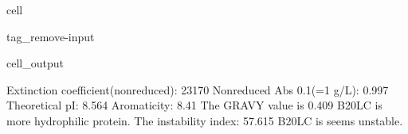 \documentclass[letterpaper,10pt,english]{jupyterBook}
\begin{document}
\begin{sphinxuseclass}{cell}
\begin{sphinxuseclass}{tag_remove-input}
\begin{sphinxVerbatimOutput}
\begin{sphinxuseclass}{cell_output}
\begin{sphinxVerbatim}[commandchars=\\\{\}]
\PYGZsh{} Extinction coefficient(non\PYGZhy{}reduced): \PYGZhy{}\PYGZhy{}\PYGZhy{}\PYGZhy{}\PYGZhy{}\PYGZhy{}\PYGZhy{}\PYGZhy{}\PYGZhy{}\PYGZhy{}\PYGZhy{}\PYGZhy{}\PYGZhy{}\PYGZhy{}\PYGZhy{}\PYGZhy{}\PYGZhy{}\PYGZhy{}\PYGZhy{}\PYGZhy{}\PYGZhy{}\PYGZhy{}23170
\PYGZsh{} Non\PYGZhy{}reduced Abs 0.1\PYGZpc{}(=1 g/L): \PYGZhy{}\PYGZhy{}\PYGZhy{}\PYGZhy{}\PYGZhy{}\PYGZhy{}\PYGZhy{}\PYGZhy{}\PYGZhy{}\PYGZhy{}\PYGZhy{}\PYGZhy{}\PYGZhy{}\PYGZhy{}\PYGZhy{}\PYGZhy{}\PYGZhy{}\PYGZhy{}\PYGZhy{}\PYGZhy{}\PYGZhy{}\PYGZhy{}\PYGZhy{}\PYGZhy{}\PYGZhy{}\PYGZhy{}\PYGZhy{}\PYGZhy{}\PYGZhy{}0.997
\PYGZsh{} Theoretical pI: \PYGZhy{}\PYGZhy{}\PYGZhy{}\PYGZhy{}\PYGZhy{}\PYGZhy{}\PYGZhy{}\PYGZhy{}\PYGZhy{}\PYGZhy{}\PYGZhy{}\PYGZhy{}\PYGZhy{}\PYGZhy{}\PYGZhy{}\PYGZhy{}\PYGZhy{}\PYGZhy{}\PYGZhy{}\PYGZhy{}\PYGZhy{}\PYGZhy{}\PYGZhy{}\PYGZhy{}\PYGZhy{}\PYGZhy{}\PYGZhy{}\PYGZhy{}\PYGZhy{}\PYGZhy{}\PYGZhy{}\PYGZhy{}\PYGZhy{}\PYGZhy{}\PYGZhy{}\PYGZhy{}\PYGZhy{}\PYGZhy{}\PYGZhy{}\PYGZhy{}\PYGZhy{}\PYGZhy{}\PYGZhy{}8.564
\PYGZsh{} Aromaticity: \PYGZhy{}\PYGZhy{}\PYGZhy{}\PYGZhy{}\PYGZhy{}\PYGZhy{}\PYGZhy{}\PYGZhy{}\PYGZhy{}\PYGZhy{}\PYGZhy{}\PYGZhy{}\PYGZhy{}\PYGZhy{}\PYGZhy{}\PYGZhy{}\PYGZhy{}\PYGZhy{}\PYGZhy{}\PYGZhy{}\PYGZhy{}\PYGZhy{}\PYGZhy{}\PYGZhy{}\PYGZhy{}\PYGZhy{}\PYGZhy{}\PYGZhy{}\PYGZhy{}\PYGZhy{}\PYGZhy{}\PYGZhy{}\PYGZhy{}\PYGZhy{}\PYGZhy{}\PYGZhy{}\PYGZhy{}\PYGZhy{}\PYGZhy{}\PYGZhy{}\PYGZhy{}\PYGZhy{}\PYGZhy{}\PYGZhy{}\PYGZhy{}\PYGZhy{}8.41\PYGZpc{}
\PYGZsh{} The GRAVY value is \PYGZhy{}\PYGZhy{}\PYGZhy{}\PYGZhy{}\PYGZhy{}\PYGZhy{}\PYGZhy{}\PYGZhy{}\PYGZhy{}\PYGZhy{}\PYGZhy{}\PYGZhy{}\PYGZhy{}\PYGZhy{}\PYGZhy{}\PYGZhy{}\PYGZhy{}\PYGZhy{}\PYGZhy{}\PYGZhy{}\PYGZhy{}\PYGZhy{}\PYGZhy{}\PYGZhy{}\PYGZhy{}\PYGZhy{}\PYGZhy{}\PYGZhy{}\PYGZhy{}\PYGZhy{}\PYGZhy{}\PYGZhy{}\PYGZhy{}\PYGZhy{}\PYGZhy{}\PYGZhy{}\PYGZhy{}\PYGZhy{}\PYGZhy{}\PYGZhy{}0.409
  B20\PYGZus{}LC is more hydrophilic protein.
\PYGZsh{} The instability index: \PYGZhy{}\PYGZhy{}\PYGZhy{}\PYGZhy{}\PYGZhy{}\PYGZhy{}\PYGZhy{}\PYGZhy{}\PYGZhy{}\PYGZhy{}\PYGZhy{}\PYGZhy{}\PYGZhy{}\PYGZhy{}\PYGZhy{}\PYGZhy{}\PYGZhy{}\PYGZhy{}\PYGZhy{}\PYGZhy{}\PYGZhy{}\PYGZhy{}\PYGZhy{}\PYGZhy{}\PYGZhy{}\PYGZhy{}\PYGZhy{}\PYGZhy{}\PYGZhy{}\PYGZhy{}\PYGZhy{}\PYGZhy{}\PYGZhy{}\PYGZhy{}\PYGZhy{}57.615
  B20\PYGZus{}LC is seems unstable.
\end{sphinxVerbatim}

\end{sphinxuseclass}\end{sphinxVerbatimOutput}

\end{sphinxuseclass}
\end{sphinxuseclass}
\end{document}
